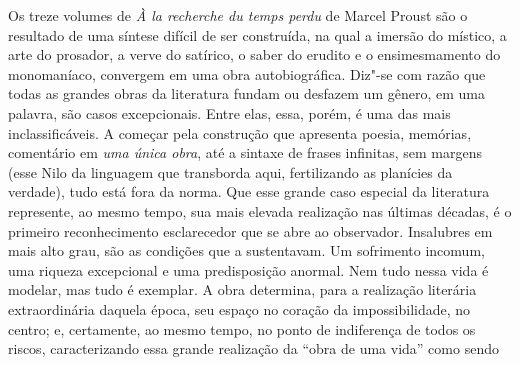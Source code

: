 \noindent{}Os treze volumes de \emph{À la recherche du temps perdu} de Marcel
Proust são o resultado de uma síntese difícil de ser construída, na qual
a imersão do místico, a arte do prosador, a verve do satírico, o saber
do erudito e o ensimesmamento do monomaníaco, convergem em uma obra
autobiográfica. Diz"-se com razão que todas as grandes obras da
literatura fundam ou desfazem um gênero, em uma palavra, são casos
excepcionais. Entre elas, essa, porém, é uma das mais inclassificáveis.
A começar pela construção que apresenta poesia, memórias, comentário em
\emph{uma única obra}, até a sintaxe de frases infinitas, sem margens
(esse Nilo da linguagem que transborda aqui, fertilizando as planícies
da verdade), tudo está fora da norma. Que esse grande caso especial da
literatura represente, ao mesmo tempo, sua mais elevada realização nas
últimas décadas, é o primeiro reconhecimento esclarecedor que se abre ao
observador. Insalubres em mais alto grau, são as condições que a
sustentavam. Um sofrimento incomum, uma riqueza excepcional e uma
predisposição anormal. Nem tudo nessa vida é modelar, mas tudo é
exemplar. A obra determina, para a realização literária extraordinária
daquela época, seu espaço no coração da impossibilidade, no centro; e,
certamente, ao mesmo tempo, no ponto de indiferença de todos os riscos,
caracterizando essa grande realização da ``obra de uma vida'' como sendo
